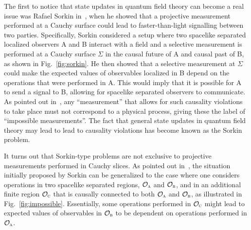\documentclass[letterpaper,12pt,titlepage,oneside,final]{book}
\newcommand{\tc}[1]{\textsc{#1}}
\begin{document}
The first to notice that state updates in quantum field theory can become a real issue was Rafael Sorkin in~\cite{Sorkin}, when he showed that a projective measurement performed at a Cauchy surface could lead to faster-than-light signalling between two parties. Specifically, Sorkin considered a setup where two spacelike separated localized observers A and B interact with a field and a selective measurement is performed at a Cauchy surface $\Sigma$ in the causal future of A and causal past of B, as shown in Fig.~\ref{fig:sorkin}. He then showed that a selective measurement at $\Sigma$ could make the expected values of observables localized in B depend on the operations that were performed in A. This would imply that it is possible for A to send a signal to B, allowing for spacelike separated observers to communicate. As pointed out in~\cite{Sorkin}, any ``measurement'' that allows for such causality violations to take place must not correspond to a physical process, giving these the label of ``impossible measurements''. The fact that general state updates in quantum field theory may lead to lead to causality violations has become known as the Sorkin problem.



It turns out that Sorkin-type problems are not exclusive to projective measurements performed in Cauchy slices. As pointed out in~\cite{impossible}, the situation initially proposed by Sorkin can be generalized to the case where one considers operations in two spacelike separated regions, $\mathcal{O}_\tc{a}$ and $\mathcal{O}_\tc{b}$, and in an additional finite region $\mathcal{O}_\tc{c}$ that is causally connected to both $\mathcal{O}_\tc{a}$ and $\mathcal{O}_\tc{b}$, as illustrated in Fig.~\ref{fig:impossible}. Essentially, some operations performed in $\mathcal{O}_\tc{c}$ might lead to expected values of observables in $\mathcal{O}_\tc{b}$ to be dependent on operations performed in $\mathcal{O}_\tc{a}$. 
\end{document}
